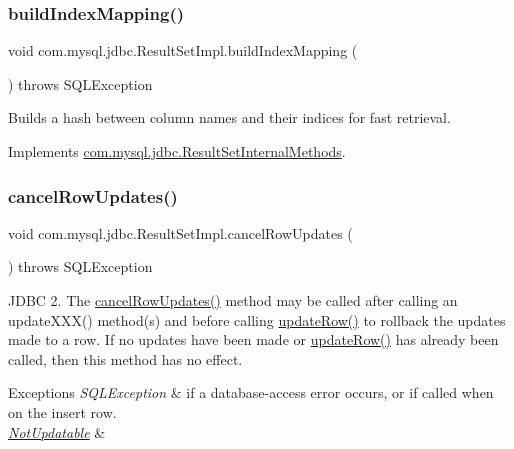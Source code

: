 \subsubsection{\texorpdfstring{build\+Index\+Mapping()}{buildIndexMapping()}}
{\footnotesize\ttfamily void com.\+mysql.\+jdbc.\+Result\+Set\+Impl.\+build\+Index\+Mapping (\begin{DoxyParamCaption}{ }\end{DoxyParamCaption}) throws S\+Q\+L\+Exception}

Builds a hash between column names and their indices for fast retrieval. 

Implements \mbox{\hyperlink{interfacecom_1_1mysql_1_1jdbc_1_1_result_set_internal_methods_a757042b555f10a48b4955346e32de2df}{com.\+mysql.\+jdbc.\+Result\+Set\+Internal\+Methods}}.

\mbox{\label{classcom_1_1mysql_1_1jdbc_1_1_result_set_impl_ae69d7d33c47f94fbe7f7c0bd38319dcd}} 
\subsubsection{\texorpdfstring{cancel\+Row\+Updates()}{cancelRowUpdates()}}
{\footnotesize\ttfamily void com.\+mysql.\+jdbc.\+Result\+Set\+Impl.\+cancel\+Row\+Updates (\begin{DoxyParamCaption}{ }\end{DoxyParamCaption}) throws S\+Q\+L\+Exception}

J\+D\+BC 2. The \mbox{\hyperlink{classcom_1_1mysql_1_1jdbc_1_1_result_set_impl_ae69d7d33c47f94fbe7f7c0bd38319dcd}{cancel\+Row\+Updates()}} method may be called after calling an update\+X\+X\+X() method(s) and before calling \mbox{\hyperlink{classcom_1_1mysql_1_1jdbc_1_1_result_set_impl_a2842d32292d023aaeeafedeed3322981}{update\+Row()}} to rollback the updates made to a row. If no updates have been made or \mbox{\hyperlink{classcom_1_1mysql_1_1jdbc_1_1_result_set_impl_a2842d32292d023aaeeafedeed3322981}{update\+Row()}} has already been called, then this method has no effect.


\begin{DoxyExceptions}{Exceptions}
{\em S\+Q\+L\+Exception} & if a database-\/access error occurs, or if called when on the insert row. \\
\hline
{\em \mbox{\hyperlink{classcom_1_1mysql_1_1jdbc_1_1_not_updatable}{Not\+Updatable}}} & \\
\hline
\end{DoxyExceptions}
\mbox{\label{classcom_1_1mysql_1_1jdbc_1_1_result_set_impl_a451fa419a4cdd5a02efd996428fcd0c4}} 
